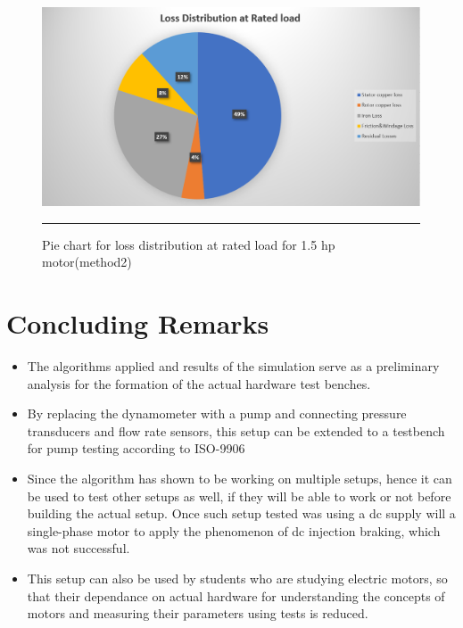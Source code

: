 \begin{figure}[hbtp!]
	\centering
		\includegraphics[width = 4.5in]{./Figures/MS/fig522.png}
		\rule{35em}{0.5pt}
	\caption{Pie chart for loss distribution at rated load for 1.5 hp motor(method2)}
	\label{fig:Pie chart for loss distribution at rated load for 1.5 hp motor(method2)} 
\end{figure}

\clearpage
\section{Concluding Remarks}
\begin{itemize}
    \item The algorithms applied and results of the simulation serve as a preliminary analysis for the formation of the actual hardware test benches. 
    \item By replacing the dynamometer with a pump and connecting pressure transducers and flow rate sensors, this setup can be extended to a testbench for pump testing according to ISO-9906
    \item Since the algorithm has shown to be working on multiple setups, hence it can be used to test other setups as well, if they will be able to work or not before building the actual setup. Once such setup tested was using a dc supply will a single-phase motor to apply the phenomenon of dc injection braking, which was not successful.
    \item This setup can also be used by students who are studying electric motors, so that their dependance on actual hardware for understanding the concepts of motors and measuring their parameters using tests is reduced.
\end{itemize}


